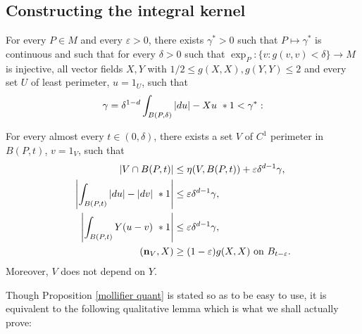 \subsection{Constructing the integral kernel}
\begin{proposition}\label{mollifier quant}
    For every $P \in M$ and every $\varepsilon > 0$, there exists $\gamma^* > 0$ such that $P \mapsto \gamma^*$ is continuous and such that for every $\delta > 0$ such that $\exp_P: \{v: g(v, v) < \delta\} \to M$ is injective, all vector fields $X, Y$ with $1/2 \leq g(X, X), g(Y, Y) \leq 2$ and every set $U$ of least perimeter, $u = 1_U$, such that
    \begin{equation}\label{bootstrap the mollifier}
    \gamma = \delta^{1 - d}\int_{B(P, \delta)} |du| - Xu ~*1 < \gamma^*:
    \end{equation}

    For every almost every $t \in (0, \delta)$, there exists a set $V$ of $C^1$ perimeter in $B(P, t)$, $v = 1_V$, such that
    \begin{align}
    |V \cap B(P, t)| &\leq \eta(V, B(P, t)) + \varepsilon \delta^{d - 1} \gamma, \label{mollifier quant1}\\
    \left|\int_{B(P, t)} |du| - |dv| ~*1\right| &\leq \varepsilon \delta^{d - 1} \gamma, \label{mollifier quant2}\\
    \left|\int_{B(P, t)} Y(u - v) ~*1\right| &\leq \varepsilon \delta^{d - 1} \gamma, \label{mollifier quant3}\\
    (\mathbf n_V, X) &\geq (1 - \varepsilon) g(X, X) \text{ on } B_{t-\varepsilon}. \label{mollifier quant4}
    \end{align}
    Moreover, $V$ does not depend on $Y$.
\end{proposition}

Though Proposition \ref{mollifier quant} is stated so as to be easy to use, it is equivalent to the following qualitative lemma which is what we shall actually prove:


